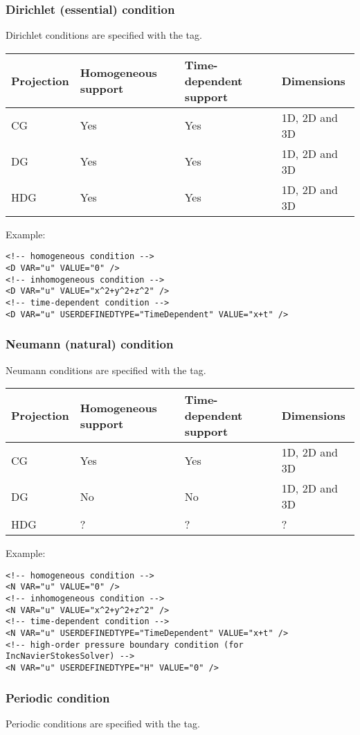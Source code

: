 \subsubsection{Dirichlet (essential) condition}
Dirichlet conditions are specified with the  tag.

\begin{tabular}{llll}
Projection & Homogeneous support & Time-dependent support & Dimensions \\
\toprule
CG & Yes & Yes & 1D, 2D and 3D \\
DG & Yes & Yes & 1D, 2D and 3D \\
HDG& Yes & Yes & 1D, 2D and 3D
\end{tabular}

Example:
\begin{lstlisting}[style=XMLStyle]
<!-- homogeneous condition -->
<D VAR="u" VALUE="0" />
<!-- inhomogeneous condition -->
<D VAR="u" VALUE="x^2+y^2+z^2" />
<!-- time-dependent condition -->
<D VAR="u" USERDEFINEDTYPE="TimeDependent" VALUE="x+t" />
\end{lstlisting}

\subsubsection{Neumann (natural) condition}
Neumann conditions are specified with the  tag.

\begin{tabular}{llll}
Projection & Homogeneous support & Time-dependent support & Dimensions \\
\toprule
CG & Yes & Yes & 1D, 2D and 3D \\
DG & No  & No  & 1D, 2D and 3D \\
HDG & ? & ? & ?
\end{tabular}

Example:
\begin{lstlisting}[style=XMLStyle]
<!-- homogeneous condition -->
<N VAR="u" VALUE="0" />
<!-- inhomogeneous condition -->
<N VAR="u" VALUE="x^2+y^2+z^2" />
<!-- time-dependent condition -->
<N VAR="u" USERDEFINEDTYPE="TimeDependent" VALUE="x+t" />
<!-- high-order pressure boundary condition (for IncNavierStokesSolver) -->
<N VAR="u" USERDEFINEDTYPE="H" VALUE="0" />
\end{lstlisting}

\subsubsection{Periodic condition}\label{sec:periodicBC}
Periodic conditions are specified with the  tag.

